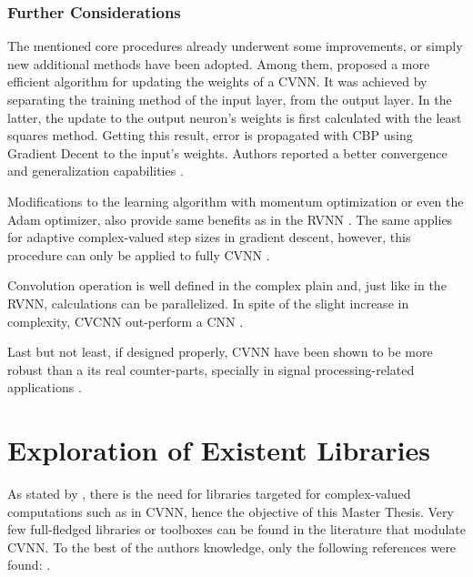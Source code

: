 \subsubsection{Further Considerations}

The mentioned core procedures already underwent some improvements, or simply new additional  methods have been adopted. Among them, \textcite{liu2017efficientweightupdate} proposed a more efficient algorithm for updating the weights of a \gls{CVNN}. It was achieved by separating the training method of the input layer, from the output layer. In the latter, the update to the output neuron's weights is first calculated with the least squares method. Getting this result, error is propagated with \gls{CBP} using Gradient Decent to  the input's weights. Authors reported a better convergence and generalization capabilities \parencite{liu2017efficientweightupdate}.  

Modifications to the learning algorithm with momentum optimization or even the Adam optimizer, also provide same benefits as in the \gls{RVNN} \parencite{kotsovsky2020new, kingma2014adam}. The same applies for adaptive complex-valued step sizes in gradient descent, however, this procedure can only be applied to fully \gls{CVNN} \parencite{zhao2023ortogradientcvnn, weijing2024gradientdescentcvnn}.

Convolution operation is well defined in the complex plain and, just like in the \gls{RVNN}, calculations can be parallelized. In spite of the slight increase in complexity, \gls{CVCNN} out-perform a \gls{CNN} \parencite{guberman2016complex, chatterjee2022cvnncomparison}.

Last but not least, if designed properly, \gls{CVNN}  have been shown to be more robust than a its real counter-parts, specially in signal processing-related applications \parencite{neacsu2022protectcvnn}.

\section{Exploration of Existent Libraries}
As stated by \parencite{bassey2021survey}, there is the need for libraries targeted for complex-valued computations such as in \gls{CVNN}, hence the objective of this Master Thesis. Very few full-fledged libraries or toolboxes can be found in the literature that modulate \gls{CVNN}. To the best of the authors knowledge, only the following references were found: \parencite{trabelsi2017tool, cruz4252610rosenpy, peker2015tool, j_agustin_barrachina_2022_7303587, dramsch2019complex, barrachina2023theory}.

